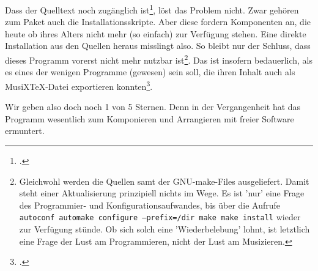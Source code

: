 Dass der Quelltext noch zugänglich
ist\footcite[vgl.][\nopage]{NoteeditRep2014a}, löst das Problem nicht. Zwar
gehören zum Paket auch die Installationsskripte. Aber diese fordern Komponenten an,
die heute ob ihres Alters nicht mehr (so einfach) zur Verfügung stehen. Eine
direkte Installation aus den Quellen heraus misslingt also. So bleibt nur der
Schluss, dass dieses Programm vorerst nicht mehr nutzbar ist\footnote{Gleichwohl
werden die Quellen samt der GNU-make-Files ausgeliefert. Damit steht einer
Aktualisierung prinzipiell nichts im Wege. Es ist 'nur' eine Frage des
Programmier- und Konfigurationsaufwandes, bis  über die Aufrufe
\texttt{autoconf automake configure --prefix=/dir make make install} wieder zur
Verfügung stünde. Ob sich solch eine 'Wiederbelebung' lohnt, ist letztlich eine
Frage der Lust am Programmieren, nicht der Lust am Musizieren. }. Das ist
insofern bedauerlich, als es eines der wenigen Programme (gewesen) sein soll,
die ihren Inhalt auch als MusiX\TeX-Datei exportieren
konnten\footcite[vgl.][\nopage wp]{Roitman2007a}.

Wir geben  also doch noch 1 von 5 Sternen. Denn in der
Vergangenheit hat das Programm wesentlich zum Komponieren und Arrangieren mit
freier Software ermuntert.


%
